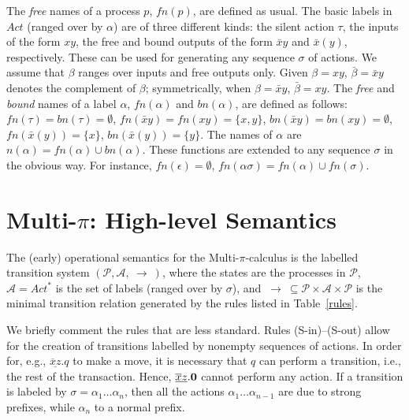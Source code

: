\documentclass[submission,copyright,creativecommons]{eptcs}
\newcommand{\sost}[2]{\mbox{$\{#1/#2\}$}}
\newcommand{\deriv}[1]{{\mbox{${\:\stackrel{#1}{\longrightarrow}\:}$}}}
\newcommand{\nil}{\mbox{\bf 0}}
\begin{document}
The {\em free} names of a process $p$, $fn(p)$, are defined as usual. %
The basic labels in $Act$ (ranged over by $\alpha$) are of three different kinds: the silent action 
$\tau$, the inputs of the form $xy$, the free and bound 
outputs of the form $\bar{x}y$ and $\bar{x}(y)$, respectively. 
These can be used for generating any sequence $\sigma$ of actions.
We assume that $\beta$ ranges over inputs and free outputs only.  
Given $\beta = xy$, $\bar\beta = \bar xy$ denotes the complement of $\beta$;
symmetrically, when $\beta = \bar xy$, $\bar\beta = xy$. 
The {\em free} and {\em bound} names of a label $\alpha$, $fn(\alpha)$ and 
$bn(\alpha)$, are defined as follows:
$fn(\tau) = bn(\tau) = \emptyset$, 
$fn(\bar{x}y) = fn(xy) = \{x,y\}$, 
$bn(\bar{x}y) = bn(xy) = \emptyset$, 
$fn(\bar{x}(y)) = \{x\}$, 
$bn(\bar{x}(y)) = \{y\}$. 
The names of $\alpha$ are $n(\alpha) = fn(\alpha)\cup bn(\alpha)$. These functions
are extended to any sequence $\sigma$ in the obvious way. For instance,
$fn(\epsilon) =  \emptyset$, $fn(\alpha\sigma) = fn(\alpha) \cup fn(\sigma)$.



\section{Multi-$\pi$: High-level Semantics}\label{multi-hi}

The (early) operational semantics for the Multi-$\pi$-calculus is the labelled 
transition system $({\mathcal P},{\mathcal A}, \deriv{ })$, where the states are the processes
in ${\mathcal P}$, ${\mathcal A} = Act^*$ 
is the set of labels (ranged over by $\sigma$),
and $\deriv{ } \subseteq {\mathcal P}\times{\mathcal A}\times{\mathcal P}$ is the minimal 
transition relation generated by the rules listed in Table~\ref{rules}.

We briefly comment the rules that are less standard. 
Rules (S-in)--(S-out) allow for the creation of
transitions labelled by nonempty sequences of actions. 
In order for, e.g.,  $\underline{\overline{x}z}.q$ to make a move, it is
necessary that $q$ can perform a transition, i.e., the rest of the transaction. Hence, $\underline{\overline{x}z}.\nil$ 
cannot perform any action. If a transition is labeled by $\sigma = \alpha_1 \ldots \alpha_n$, then all the
actions $\alpha_1 \ldots \alpha_{n-1}$ are due to strong prefixes, while $\alpha_n$ to a
normal prefix.
\end{document}
